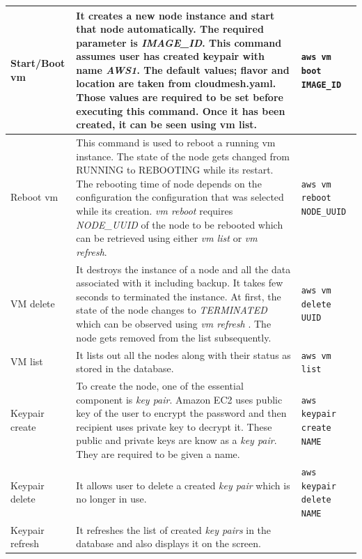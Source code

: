 \documentclass[9pt,twocolumn,twoside]{../../styles/osajnl}
\begin{document}
\begin{table}[p]
\begin{center}
\begin{tabular}{p{2cm}p{10cm}p{5cm}}
  \hline
  Start/Boot vm & It creates a new node instance and start that
                  node automatically. The required parameter is
                  \textit{IMAGE\_ID}. This command assumes user has created keypair
                  with name \textit{AWS1}. The default values; flavor and location are
                  taken from cloudmesh.yaml. Those values are required to be set
                  before executing this command. Once it has been created, it can be
                  seen using vm list.
                         & \verb+aws vm boot IMAGE_ID+ \\
  \hline
  Reboot vm & This command is used to reboot a running vm
              instance. The state of the node gets changed from RUNNING to
              REBOOTING while its restart. The rebooting time of node depends on
              the configuration the configuration that was selected while its
              creation. \textit{vm reboot} requires \textit{NODE\_UUID} of the
              node to be rebooted which can be retrieved using either \textit{vm
              list} or \textit{vm refresh}.
                         & \verb+aws vm reboot NODE_UUID+ \\
  \hline
  VM delete & It destroys the instance of a node and all the data
              associated with it including backup. It takes few seconds to
              terminated the instance. At first, the state of the node changes
              to \textit{TERMINATED} which can be observed using \textit{vm
              refresh} . The node gets removed from the list subsequently.
                         & \verb+aws vm delete UUID+ \\
  \hline
  VM list  & It lists out all the nodes along with their status as stored in the database.
                         & \verb+aws vm list+ \\
  \hline
  Keypair create & To create the node, one of the essential component is \textit{key pair}. Amazon EC2 uses public key of the user to encrypt the password and then recipient uses private key to decrypt it. These public and private keys are know as a \textit{key pair}. They are required to be given a name.
                         & \verb+aws keypair create NAME+ \\
  \hline
  Keypair delete & It allows user to delete a created \textit{key pair} which is no longer in use.
                         & \verb+aws keypair delete NAME+ \\
  \hline
  Keypair refresh & It refreshes the list of created \textit{key pairs} in the database and also displays it on the screen.

\end{tabular}
\end{center}
\end{table}
\end{document}

